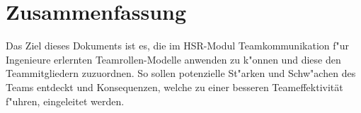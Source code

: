 
\chapter{Zusammenfassung}

Das Ziel dieses Dokuments ist es, die im HSR-Modul Teamkommunikation f"ur Ingenieure erlernten
Teamrollen-Modelle anwenden zu k"onnen und diese den Teammitgliedern zuzuordnen. So sollen potenzielle
St"arken und Schw"achen des Teams entdeckt und Konsequenzen, welche zu einer besseren Teameffektivität f"uhren, eingeleitet werden.

\begin{comment}
\section{Lorem}
Lorem ipsum dolor sit amet, consectetur adipiscing elit. Sed gravida mollis placerat. Sed congue iaculis massa vitae dapibus. Fusce sed felis lorem. Suspendisse purus diam, sollicitudin vitae imperdiet ac, placerat eu metus. In luctus, metus vel dictum hendrerit, diam lacus cursus enim, eu porta augue lacus non metus. Pellentesque habitant morbi tristique senectus et netus et malesuada fames ac turpis egestas. Nullam nec orci eget metus pulvinar sagittis. Vestibulum ante ipsum primis in faucibus orci luctus et ultrices posuere cubilia Curae; Sed turpis lorem, aliquet eu ornare non, viverra ac urna.

Praesent libero lectus, ultrices eget pharetra sed, sollicitudin et est. Pellentesque quis urna eget lorem sodales venenatis eget nec quam. In sagittis aliquam auctor. Phasellus vitae ipsum purus, sit amet imperdiet nunc. Pellentesque habitant morbi tristique senectus et netus et malesuada fames ac turpis egestas. Ut malesuada nibh ut lectus scelerisque sed iaculis lectus varius. Nulla blandit turpis tortor. Nulla facilisi. Cum sociis natoque penatibus et magnis dis parturient montes, nascetur ridiculus mus. Nam leo ante, porta vel scelerisque at, volutpat eu sapien. Aliquam viverra adipiscing sapien et porta. Sed quis diam ut sem tincidunt consectetur varius non dolor. Fusce fermentum, quam vitae suscipit euismod, leo erat malesuada ante, ac consequat est lacus eget enim. Proin lacinia justo et est vehicula adipiscing rhoncus lacus mollis.	
\end{comment}